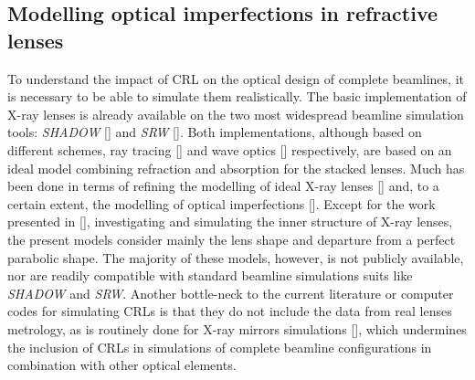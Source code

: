 
\begin{refsection}
\chapter{Modelling optical imperfections in refractive lenses}\label{sec:modelling}

To understand the impact of CRL on the optical design of complete beamlines, it is necessary to be able to simulate them realistically. The basic implementation of X-ray lenses is already available on the two most widespread beamline simulation tools: \textit{SHADOW} [\cite{SanchezdelRio2011}] and \textit{SRW} [\cite{Chubar1998}]. Both implementations, although based on different schemes, ray tracing [\cite{Alianelli2007}] and wave optics [\cite{Baltser2011}] respectively, are based on an ideal model combining refraction and absorption for the stacked lenses. Much has been done in terms of refining the modelling of ideal X-ray lenses [\cite{Umbach2008, SanchezdelRio2012, Osterhoff2013, Simons2017, Pedersen2018}] and, to a certain extent, the modelling of optical imperfections [\cite{Pantell2001, Andrejczuk2010, Gasilov2017, Osterhoff2017}]. Except for the work presented in [\cite{Roth2014}], investigating and simulating the inner structure of X-ray lenses, the present models consider mainly the lens shape and departure from a perfect parabolic shape. The majority of these models, however, is not publicly available, nor are readily compatible with standard beamline simulations suits like \textit{SHADOW} and \textit{SRW}. Another bottle-neck to the current literature or computer codes for simulating CRLs is that they do not include the data from real lenses metrology, as is routinely done for X-ray mirrors simulations [\cite{SanchezDelRio2016}], which undermines the inclusion of CRLs in simulations of complete beamline configurations in combination with other optical elements.


\end{refsection}
